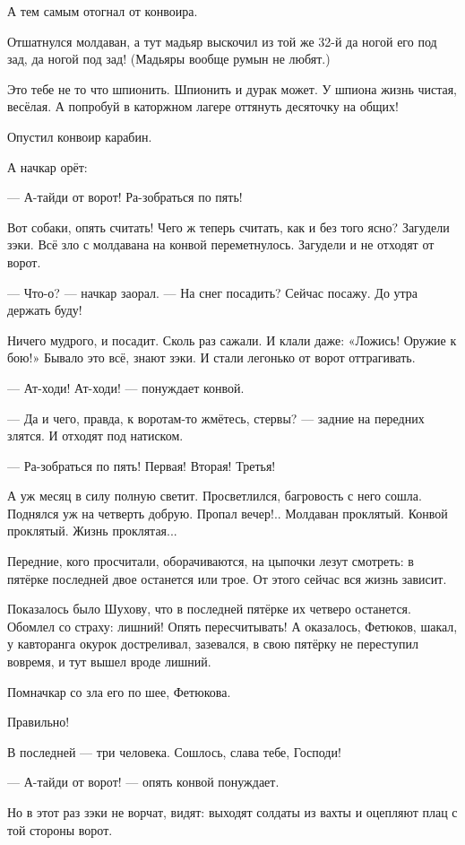А тем самым отогнал от конвоира.

Отшатнулся молдаван, а тут мадьяр выскочил из той же 32-й да ногой его под зад, да ногой под
зад! (Мадьяры вообще румын не любят.)

Это тебе не то что шпионить. Шпионить и дурак может. У шпиона жизнь чистая, весёлая. А
попробуй в каторжном лагере оттянуть десяточку на общих!

Опустил конвоир карабин.

А начкар орёт:

--- А-тайди от ворот! Ра-зобраться по пять!

Вот собаки, опять считать! Чего ж теперь считать, как и без того ясно? Загудели зэки. Всё зло с
молдавана на конвой переметнулось. Загудели и не отходят от ворот.

--- Что-о? --- начкар заорал. --- На снег посадить? Сейчас посажу. До утра держать буду!

Ничего мудрого, и посадит. Сколь раз сажали. И клали даже: «Ложись! Оружие к бою!» Бывало это
всё, знают зэки. И стали легонько от ворот оттрагивать.

--- Ат-ходи! Ат-ходи! --- понуждает конвой.

--- Да и чего, правда, к воротам-то жмётесь, стервы? --- задние на передних злятся. И отходят под
натиском.

--- Ра-зобраться по пять! Первая! Вторая! Третья!

А уж месяц в силу полную светит. Просветлился, багровость с него сошла. Поднялся уж на
четверть добрую. Пропал вечер!.. Молдаван проклятый. Конвой проклятый. Жизнь проклятая...

Передние, кого просчитали, оборачиваются, на цыпочки лезут смотреть: в пятёрке последней
двое останется или трое. От этого сейчас вся жизнь зависит.

Показалось было Шухову, что в последней пятёрке их четверо останется. Обомлел со страху:
лишний! Опять пересчитывать! А оказалось, Фетюков, шакал, у кавторанга окурок достреливал,
зазевался, в свою пятёрку не переступил вовремя, и тут вышел вроде лишний.

Помначкар со зла его по шее, Фетюкова.

Правильно!

В последней --- три человека. Сошлось, слава тебе, Господи!

--- А-тайди от ворот! --- опять конвой понуждает.

Но в этот раз зэки не ворчат, видят: выходят солдаты из вахты и оцепляют плац с той стороны
ворот.

